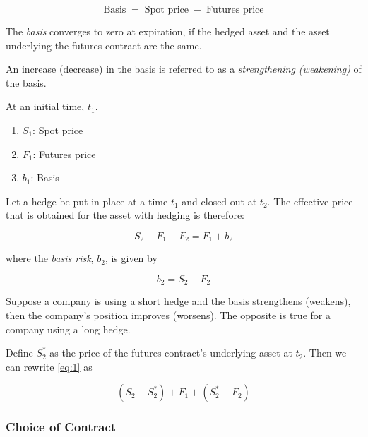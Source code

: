 \begin{definition}[Basis]
    \[\textrm{Basis}\; =\; \textrm{Spot price}\; -\; \textrm{Futures price}\]
\end{definition}
\begin{note}
    The \emph{basis} converges to zero at expiration, if the hedged asset and the asset underlying the futures contract are the same.
\end{note}

\begin{definition}
    An increase (decrease) in the basis is referred to as a \emph{strengthening (weakening)} of the basis.
\end{definition}

\begin{notation}
    At an initial time, \(t_{1}\).
    \begin{enumerate}
        \item[] \(S_{1}\): Spot price
        \item[] \(F_{1}\): Futures price
        \item[] \(b_{1}\): Basis
    \end{enumerate}
\end{notation}

Let a hedge be put in place at a time \(t_1\) and closed out at \(t_2\). The effective price that is obtained for the asset with hedging is therefore:

\begin{equation}
    S_{2}+F_{1}-F_{2}=F_{1}+b_{2}
    \label{eq:1}
\end{equation}

where the \emph{basis risk}, \(b_{2}\), is given by

\begin{equation*}
    b_{2}=S_{2}-F_{2}
\end{equation*}

Suppose a company is using a short hedge and the basis strengthens (weakens), then the company's position improves (worsens). The opposite is true for a company using a long hedge.

Define \(S^*_{2}\) as the price of the futures contract's underlying asset at \(t_{2}\). Then we can rewrite \eqref{eq:1} as

\begin{equation*}
    (S_{2} - S^*_{2}) + F_{1} + (S^*_{2  } - F_{2})
\end{equation*}

\subsubsection*{Choice of Contract}

